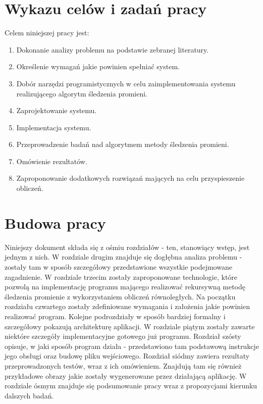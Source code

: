 \section{Wykazu celów i zadań pracy}

Celem niniejszej pracy jest:
\begin{enumerate}
\item Dokonanie analizy problemu na podstawie zebranej literatury.
\item Określenie wymagań jakie powinien spełniać system.
\item Dobór narzędzi programistycznych w celu zaimplementowania systemu realizującego algorytm śledzenia promieni.
\item Zaprojektowanie systemu.
\item Implementacja systemu.
\item Przeprowadzenie badań nad algorytmem metody śledzenia promieni.
\item Omówienie rezultatów.
\item Zaproponowanie dodatkowych rozwiązań mających na celu przyspieszenie obliczeń.
\end{enumerate}

\section{Budowa pracy}

Niniejszy dokument składa się z ośmiu rozdziałów - ten, stanowiący wstęp, jest jednym z nich. W rozdziale drugim znajduje się dogłębna analiza problemu - zostały tam w sposób szczegółowy przedstawione wszystkie podejmowane zagadnienie. W rozdziale trzecim zostały zaproponowane technologie, które pozwolą na implementację programu mającego realizować rekursywną metodę śledzenia promienie z wykorzystaniem obliczeń równoległych. Na początku rozdziału czwartego zostały zdefiniowane wymagania i założenia jakie powinien realizować program. Kolejne podrozdziały w sposób bardziej formalny i szczegółowy pokazują architekturę aplikacji. W rozdziale piątym zostały zawarte niektóre szczegóły implementacyjne gotowego już programu. Rozdział szósty opisuje, w jaki sposób program działa - przedstawiono tam podstawową instrukcje jego obsługi oraz budowę pliku wejściowego. Rozdział siódmy zawiera rezultaty przeprowadzonych testów, wraz z ich omówieniem. Znajdują tam się również przykładowe obrazy jakie zostały wygenerowane przez działającą aplikację. W rozdziale ósmym znajduje się podsumowanie pracy wraz z propozycjami kierunku dalszych badań.